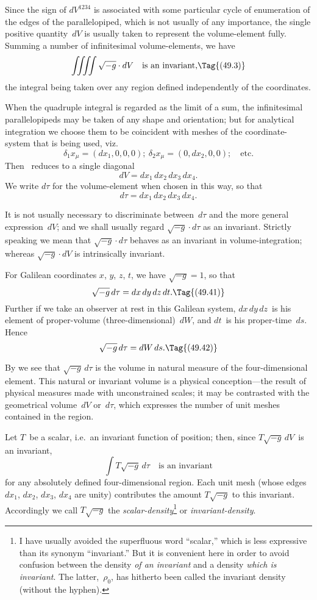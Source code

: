\documentclass[12pt]{book}
\begin{document}
Since the sign of $dV^{1234}$ is associated with some particular cycle of
enumeration of the edges of the parallelopiped, which is not usually of any
importance, the single positive quantity~$dV$ is usually taken to represent the
volume-element fully. Summing a number of infinitesimal volume-elements,
%
we have
\[
\iiiint \sqrt{-g} \cdot dV\quad\text{is an invariant,}
\Tag{(49.3)}
\]
the integral being taken over any region defined independently of the
coordinates.

When the quadruple integral is regarded as the limit of a sum, the infinitesimal
parallelopipeds may be taken of any shape and orientation; but for
analytical integration we choose them to be coincident with meshes of the
coordinate-system that is being used, viz.\
\[
\delta_{1} x_{\mu} = (dx_{1}, 0, 0, 0);\
\delta_{2} x_{\mu} = (0, dx_{2} , 0, 0);\quad\text{etc.}
\]
Then ~reduces to a single diagonal
\[
dV = dx_{1}\, dx_{2}\, dx_{3}\, dx_{4}.
\]
We write $d\tau$ for the volume-element when chosen in this way, so that
\[
d\tau = dx_{1}\, dx_{2}\, dx_{3}\, dx_{4}.
\]

It is not usually necessary to discriminate between~$d\tau$ and the more
general expression~$dV$; and we shall usually regard $\sqrt{-g} \cdot d\tau$ as an invariant.
Strictly speaking we mean that $\sqrt{-g} \cdot d\tau$ behaves as an invariant in volume-integration;
whereas $\sqrt{-g} \cdot dV$ is intrinsically invariant.

For Galilean coordinates $x$, $y$, $z$, $t$, we have $\sqrt{-g} = 1$, so that
\[
\sqrt{-g}\, d\tau = dx\, dy\, dz\, dt.
\Tag{(49.41)}
\]
Further if we take an observer at rest in this Galilean system, $dx\, dy\,dz$~is his
element of proper-volume (three-dimensional)~$dW$, and $dt$~is his proper-time~$ds$.
\index{Proper-volume}%
Hence
\[
\sqrt{-g}\, d\tau = dW\, ds.
\Tag{(49.42)}
\]

By  we see that $\sqrt{-g}\, d\tau$ is the volume in natural measure of the
four-dimensional element. This natural or invariant volume is a physical
conception---the result of physical measures made with unconstrained scales;
it may be contrasted with the geometrical volume~$dV$ or~$d\tau$, which expresses
the number of unit meshes contained in the region.

Let $T$~be a scalar, i.e.\ an invariant function of position; then, since
$T\sqrt{-g}\, dV$~is an invariant,
\[
\int T\sqrt{-g}\, d\tau\quad\text{is an invariant}
\]
for any absolutely defined four-dimensional region. Each unit mesh (whose
edges $dx_{1}$, $dx_{2}$, $dx_{3}$, $dx_{4}$ are unity) contributes the amount $T\sqrt{-g}$ to this
\PageSep{111}
invariant. Accordingly we call $T\sqrt{-g}$ the \emph{scalar-density}\footnote
  {I have usually avoided the superfluous word ``scalar,'' which is less expressive than its
  synonym ``invariant.'' But it is convenient here in order to avoid confusion between the density
  \emph{of an invariant} and a density \emph{which is invariant}. The latter,~$\rho_{0}$, has hitherto been called the
  invariant density (without the hyphen).}
or \emph{invariant-density}.
\index{Density!scalar-and tensor-}%
\index{Scalar-density}%
%
\end{document}
